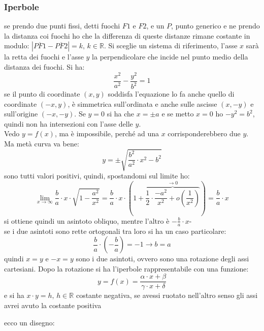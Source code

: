\documentclass[a4paper,12pt, oneside]{book}
\begin{document}
\subsubsection{Iperbole}
\begin{definizione}
se prendo due punti fissi, detti fuochi $F1$ e $F2$, e un $P$, punto generico e ne prendo la distanza coi fuochi ho che la differenza di queste distanze rimane costante in modulo: $|\overline{PF1}-\overline{PF2}|=k,\, k\in \mathbb{R}$. Si sceglie un sistema di riferimento, l'asse $x$ sarà la retta dei fuochi e l'asse $y$ la perpendicolare che incide nel punto medio della distanza dei fuochi. Si ha:
$$\frac{x^2}{a^2}-\frac{y^2}{b^2}=1$$
se il punto di coordinate $(x,y)$ soddisfa l'equazione lo fa anche quello di coordinate $(-x,y)$, è simmetrica sull'ordinata e anche sulle ascisse $(x,-y)$ e sull'origine $(-x,-y)$. Se $y=0$ si ha che $x=\pm a$ e se metto $x=0$ ho $-y^2= b^2$, quindi non ha intersezioni con l'asse delle $y$. \\ Vedo $y=f(x)$, ma è impossibile, perché ad una $x$ corrisponderebbero due $y$. Ma metà curva va bene:
$$y=\pm\sqrt{\frac{b^2}{a^2}\cdot x^2-b^2}$$
sono tutti valori positivi, quindi, spostandomi sul limite ho:
$$\lim_{x\to\infty} \frac{b}{a}\cdot x\cdot \sqrt{1-\frac{a^2}{x^2}}= \frac{b}{a}\cdot x\cdot \left(1+\overbrace{\frac{1}{2}\cdot \frac{-a^2}{x^2}+o\left(\frac{1}{x^2}\right)}^{\to 0}\right)=\frac{b}{a}\cdot x$$
si ottiene quindi un asintoto obliquo, mentre l'altro è  $-\frac{b}{a}\cdot x$-\\ se i due asintoti sono rette ortogonali tra loro si ha un caso particolare:
$$\frac{b}{a}\cdot \left(-\frac{b}{a}\right)=-1\longrightarrow b=a$$
quindi $x=y$ e $ -x=y$ sono i due asintoti, ovvero sono una rotazione degli assi cartesiani. Dopo la rotazione si ha l'iperbole rappresentabile con una funzione:
 $$y=f(x)=\frac{\alpha\cdot x +\beta}{\gamma\cdot x +\delta}$$
 e si ha $x\cdot y=h,\, h\in \mathbb{R}$ costante negativa, se avessi ruotato nell'altro senso gli assi avrei avuto la costante positiva

ecco un disegno:
\begin{center}


\end{center}
\end{definizione}
\end{document}
